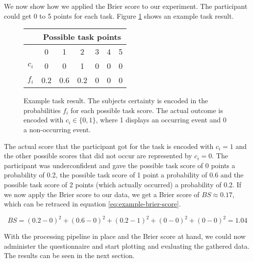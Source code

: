 \documentclass[../main/main.tex]{subfiles}
\begin{document}
	We now show how we applied the Brier score to our experiment. The participant could get 0 to 5 points for each task. Figure \ref{fig:example} shows an example task result.
	
	\begin{figure}[h]
		\centering
		\begin{tabular}{c|c|c|c|c|c|c|}
			& \multicolumn{6}{c|}{Possible task points} \\
			\hline
			& 0 & 1 & 2 & 3 & 4 & 5 \\
			\hline
			$c_i$ & 0 & 0 & 1 & 0 & 0 & 0 \\
			$f_i$ & 0.2 & 0.6 & 0.2 & 0 & 0 & 0\\
		\end{tabular}
		\caption{Example task result. The subjects certainty is encoded in the probabilities $f_i$ for each possible task score. The actual outcome is encoded with $c_i \in \{0, 1\}$, where 1 displays an occurring event and 0 a non-occurring event.}
		\label{fig:example}
	\end{figure}

	The actual score that the participant got for the task is encoded with $c_i = 1$ and the other possible scores that did not occur are represented by $c_i = 0$. The participant was underconfident and gave the possible task score of 0 points a probability of 0.2, the possible task score of 1 point a probability of 0.6 and the possible task score of 2 points (which actually occurred) a probability of 0.2. If we now apply the Brier score to our data, we get a Brier score of $BS \approx 0.17$, which can be retraced in equation \ref{eq:example-brier-score}.
	
	\begin{equation}
		\label{eq:example-brier-score}
		BS = (0.2 - 0)^2 + (0.6 - 0)^2 + (0.2 - 1)^2 + (0 - 0)^2 + (0 - 0)^2 = 1.04
	\end{equation}
	
	\noindent With the processing pipeline in place and the Brier score at hand, we could now administer the questionnaire and start plotting and evaluating the gathered data. The results can be seen in the next section.
\end{document}
